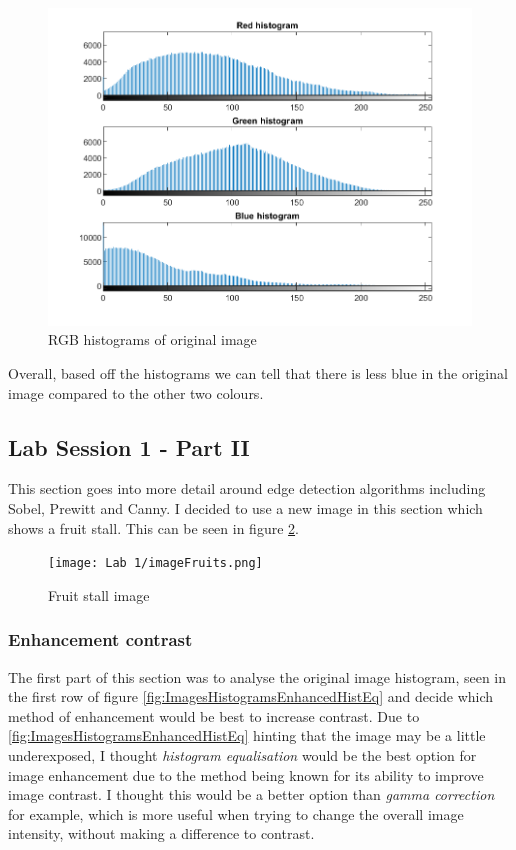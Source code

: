 \documentclass[11pt, letterpaper]{article}
\begin{document}
\begin{figure}[ht] %
    \centering
    \includegraphics[width=0.6 \linewidth]{Lab 1/imageWRGBhist.png}
    \caption{RGB histograms of original image}
    \label{fig:imageWRGBhist}
\end{figure}

Overall, based off the histograms we can tell that there is less blue in the original image compared to the other two colours. 


\subsection{Lab Session 1 - Part II}
This section goes into more detail around edge detection algorithms including Sobel, Prewitt and Canny. I decided to use a new image in this section which shows a fruit stall. This can be seen in figure \ref{fig:Fruits}.

\begin{figure}[ht]
    \centering
    \texttt{[image: Lab 1/imageFruits.png]}
    \caption{Fruit stall image}
    \label{fig:Fruits}
\end{figure}

\subsubsection*{Enhancement contrast}
The first part of this section was to analyse the original image histogram, seen in the first row of figure \ref{fig:ImagesHistogramsEnhancedHistEq} and decide which method of enhancement would be best to increase contrast. Due to \ref{fig:ImagesHistogramsEnhancedHistEq} hinting that the image may be a little underexposed, I thought \textit{histogram equalisation} would be the best option for image enhancement due to the method being known for its ability to improve image contrast.
I thought this would be a better option than \textit{gamma correction} for example, which is more useful when trying to change the overall image intensity, without making a difference to contrast.
\end{document}
